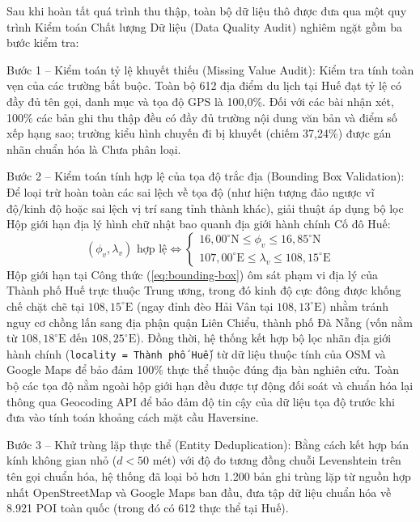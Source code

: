 Sau khi hoàn tất quá trình thu thập, toàn bộ dữ liệu thô được đưa qua một quy trình Kiểm toán Chất lượng Dữ liệu (Data Quality Audit) nghiêm ngặt gồm ba bước kiểm tra:

Bước 1 -- Kiểm toán tỷ lệ khuyết thiếu (Missing Value Audit): Kiểm tra tính toàn vẹn của các trường bắt buộc. Toàn bộ 612 địa điểm du lịch tại Huế đạt tỷ lệ có đầy đủ tên gọi, danh mục và tọa độ GPS là 100,0\%. Đối với các bài nhận xét, 100\% các bản ghi thu thập đều có đầy đủ trường nội dung văn bản và điểm số xếp hạng sao; trường kiểu hình chuyến đi bị khuyết (chiếm 37,24\%) được gán nhãn chuẩn hóa là Chưa phân loại.

Bước 2 -- Kiểm toán tính hợp lệ của tọa độ trắc địa (Bounding Box Validation): Để loại trừ hoàn toàn các sai lệch về tọa độ (như hiện tượng đảo ngược vĩ độ/kinh độ hoặc sai lệch vị trí sang tỉnh thành khác), giải thuật áp dụng bộ lọc Hộp giới hạn địa lý hình chữ nhật bao quanh địa giới hành chính Cố đô Huế:
\begin{equation}
    (\phi_v, \lambda_v) \text{ hợp lệ} \iff \begin{cases}
        16,00^{\circ}\text{N} \le \phi_v \le 16,85^{\circ}\text{N} \\
        107,00^{\circ}\text{E} \le \lambda_v \le 108,15^{\circ}\text{E}
    \end{cases}
    \label{eq:bounding-box}
\end{equation}
Hộp giới hạn tại Công thức (\ref{eq:bounding-box}) ôm sát phạm vi địa lý của Thành phố Huế trực thuộc Trung ương, trong đó kinh độ cực đông được khống chế chặt chẽ tại $108{,}15^{\circ}\text{E}$ (ngay đỉnh đèo Hải Vân tại $108{,}13^{\circ}\text{E}$) nhằm tránh nguy cơ chồng lấn sang địa phận quận Liên Chiểu, thành phố Đà Nẵng (vốn nằm từ $108{,}18^{\circ}\text{E}$ đến $108{,}25^{\circ}\text{E}$). Đồng thời, hệ thống kết hợp bộ lọc nhãn địa giới hành chính (\texttt{locality = Thành phố Huế}) từ dữ liệu thuộc tính của OSM và Google Maps để bảo đảm 100\% thực thể thuộc đúng địa bàn nghiên cứu. Toàn bộ các tọa độ nằm ngoài hộp giới hạn đều được tự động đối soát và chuẩn hóa lại thông qua Geocoding API để bảo đảm độ tin cậy của dữ liệu tọa độ trước khi đưa vào tính toán khoảng cách mặt cầu Haversine.

Bước 3 -- Khử trùng lặp thực thể (Entity Deduplication): Bằng cách kết hợp bán kính không gian nhỏ ($d < 50\text{ mét}$) với độ đo tương đồng chuỗi Levenshtein trên tên gọi chuẩn hóa, hệ thống đã loại bỏ hơn 1.200 bản ghi trùng lặp từ nguồn hợp nhất OpenStreetMap và Google Maps ban đầu, đưa tập dữ liệu chuẩn hóa về 8.921 POI toàn quốc (trong đó có 612 thực thể tại Huế).

